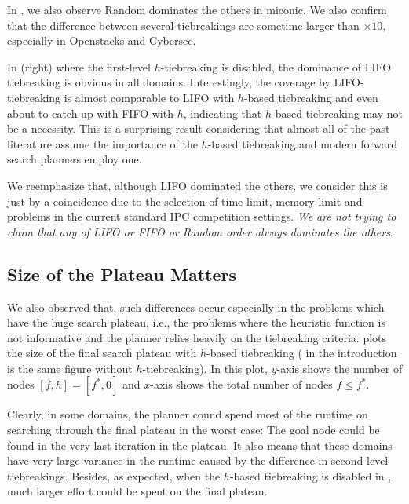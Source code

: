 In , we also observe Random dominates the others
in miconic.
We also confirm that the difference between several
tiebreakings are sometime larger than $\times 10$, especially in
Openstacks and Cybersec.

In  (right) where the first-level
$h$-tiebreaking is disabled, the dominance of LIFO tiebreaking is
obvious in all domains.  Interestingly, the coverage by LIFO-tiebreaking
is almost comparable to LIFO with $h$-based tiebreaking and even about
to catch up with FIFO with $h$, indicating that $h$-based tiebreaking
may not be a necessity. This is a surprising result considering that
almost all of the past literature assume the importance of the $h$-based
tiebreaking and modern forward search planners employ one.

We reemphasize that, although LIFO dominated the others, we consider
this is just by a coincidence due to the selection of time limit, memory
limit and problems in the current standard IPC competition
settings. \emph{We are not trying to claim that any of LIFO or FIFO or
Random order always dominates the others}.


\subsection{Size of the Plateau Matters}

We also observed that, such differences occur especially in the problems
which have the huge search plateau, i.e., the problems where the
heuristic function is not informative and the planner relies heavily on
the tiebreaking criteria.
% 
 plots the size of the final search plateau with
$h$-based tiebreaking ( in the introduction is
the same figure without $h$-tiebreaking). In this plot, $y$-axis
shows the number of nodes $[f,h]=[f^*,0]$ and $x$-axis shows the total
number of nodes $f\leq f^*$.

Clearly, in some domains, the planner cound spend most of the runtime on
searching through the final plateau in the worst case: The goal node
could be found in the very last iteration in the plateau. It also
means that these domains have very large variance in the runtime caused
by the difference in second-level tiebreakings. Besides, as expected, when the
$h$-based tiebreaking is disabled in , much
larger effort could be spent on the final plateau.

